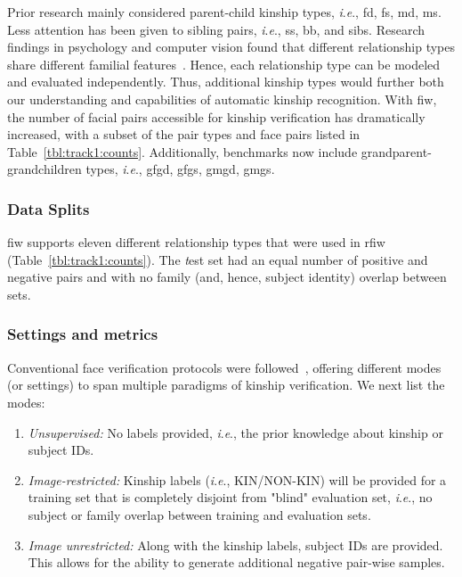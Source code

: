 \documentclass[letterpaper, 10 pt, conference]{ieeeconf}  %
\newcommand{\ie}{\textit{i}.\textit{e}., }
\begin{document}
 
Prior research mainly considered parent-child kinship types, \ie \ac{fd}, \ac{fs}, \ac{md}, \ac{ms}. Less attention has been given to sibling pairs, \ie \ac{ss}, \ac{bb}, and \ac{sibs}. Research findings in psychology and computer vision found that different relationship types share different familial features~\cite{Ming_CVPR11_Genealogical}. Hence, each relationship type can be modeled and evaluated independently. Thus, additional kinship types would further both our understanding and capabilities of automatic kinship recognition. With \ac{fiw}, the number of facial pairs accessible for kinship verification has dramatically increased, with a subset of the pair types and face pairs listed in Table~\ref{tbl:track1:counts}. Additionally, benchmarks now include grandparent-grandchildren types, \ie \ac{gfgd}, \ac{gfgs}, \ac{gmgd}, \ac{gmgs}.




\subsubsection{Data Splits}
 \ac{fiw} supports eleven different relationship types that were used in \ac{rfiw} (Table~\ref{tbl:track1:counts}). The {\emph test} set had an equal number of positive and negative pairs and with no family (and, hence, subject identity) overlap between sets. 


\subsubsection{Settings and metrics}\label{subsec:track1:settings}
Conventional face verification protocols were followed~\cite{LFWTech}, offering different modes (or settings) to span multiple paradigms of kinship verification. We next list the modes:
\begin{enumerate}
    \item \textit{Unsupervised:} No labels provided, \ie the prior knowledge about kinship or subject IDs.
    \item \textit{Image-restricted:} Kinship labels (\ie KIN/NON-KIN) will be provided for a training set that is completely disjoint from "blind" evaluation set, \ie no subject or family overlap between training and evaluation sets.
    \item \textit{Image unrestricted:} Along with the kinship labels, subject IDs are provided. This allows for the ability to generate additional negative pair-wise samples.
\end{enumerate}
\end{document}
